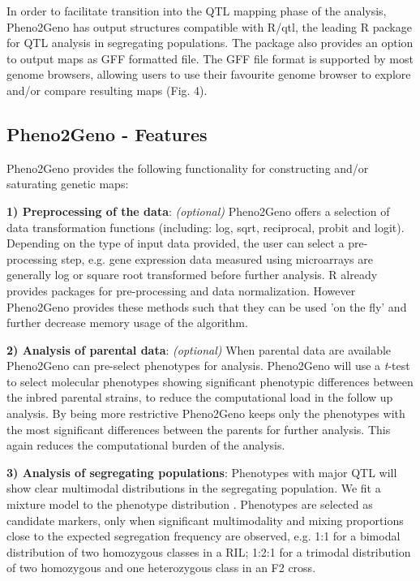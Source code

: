 \documentclass[8pt, twoside, a5paper]{report}
\begin{document}
In order to facilitate transition into the QTL mapping phase of the analysis, Pheno2Geno has output structures compatible with 
R/qtl, the leading R package for QTL analysis in segregating populations\cite{broman:2003, arends:2010}. The package also provides an option to output 
maps as GFF formatted file. The GFF file format is supported by most genome browsers, allowing users to use their favourite genome 
browser to explore and/or compare resulting maps (Fig. 4).

\subsection{Pheno2Geno - Features}
Pheno2Geno provides the following functionality for constructing and/or saturating genetic maps:

{\bf 1) Preprocessing of the data}: \emph{(optional)} Pheno2Geno offers a selection of data transformation functions (including: 
log, sqrt, reciprocal, probit and logit). Depending on the type of input data provided, the user can select a pre-processing step, 
e.g. gene expression data measured using microarrays are generally log\cite{Quackenbush:2002} or square root\cite{jansen:2001, 
Gort:2010} transformed before further analysis. R already provides packages for pre-processing and data normalization. However 
Pheno2Geno provides these methods such that they can be used 'on the fly' and further decrease memory usage of the algorithm.

{\bf 2) Analysis of parental data}: \emph{(optional)} When parental data are available Pheno2Geno can pre-select phenotypes for 
analysis. Pheno2Geno will use a \emph{t}-test to select molecular phenotypes showing significant phenotypic differences between 
the inbred parental strains, to reduce the computational load in the follow up analysis. By being more restrictive Pheno2Geno 
keeps only the phenotypes with the most significant differences between the parents for further analysis. This again reduces 
the computational burden of the analysis.

{\bf 3) Analysis of segregating populations}:
Phenotypes with major QTL will show clear multimodal distributions in the segregating population. We fit a mixture model 
to the phenotype distribution \cite{jansen:1993, jansen:2001, Benaglia:2009}. Phenotypes are selected as candidate markers, 
only when significant multimodality and mixing proportions close to the expected segregation frequency are observed, e.g. 
1:1 for a bimodal distribution of two homozygous classes in a RIL; 1:2:1 for a trimodal distribution of two homozygous and 
one heterozygous class in an F2 cross.
\end{document}

